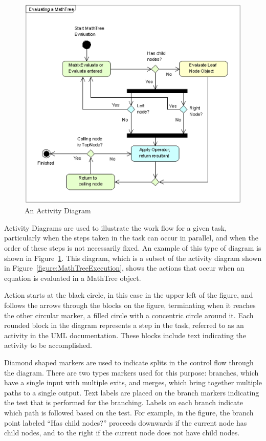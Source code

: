 \begin{figure}[htb]
\begin{center}
\includegraphics[scale=0.5]{Images/UmlActivitySample.eps}
\caption{\label{figure:UmlActivityExample}An Activity Diagram}
\end{center}
\end{figure}

Activity Diagrams are used to illustrate the work flow for a given task, particularly when the steps
taken in the task can occur in parallel, and when the order of these steps is not necessarily fixed.
 An example of this type of diagram is shown in Figure~\ref{figure:UmlActivityExample}.  This
diagram, which is a subset of the activity diagram shown in Figure~\ref{figure:MathTreeExecution},
shows the actions that occur when an equation is evaluated in a MathTree object.

Action starts at the black circle, in this case in the upper left of the figure, and follows the
arrows through the blocks on the figure, terminating when it reaches the other circular marker, a
filled circle with a concentric circle around it.  Each rounded block in the diagram represents a
step in the task, referred to as an activity in the UML documentation.  These blocks include text
indicating the activity to be accomplished.

Diamond shaped markers are used to indicate splits in the control flow through the diagram.  There
are two types markers used for this purpose: branches, which have a single input with multiple
exits, and merges, which bring together multiple paths to a single output.  Text labels are placed
on the branch markers indicating the test that is performed for the branching.  Labels on each
branch indicate which path is followed based on the test.  For example, in the figure, the branch
point labeled ``Has child nodes?'' proceeds downwards if the current node has child nodes, and to
the right if the current node does not have child nodes.


